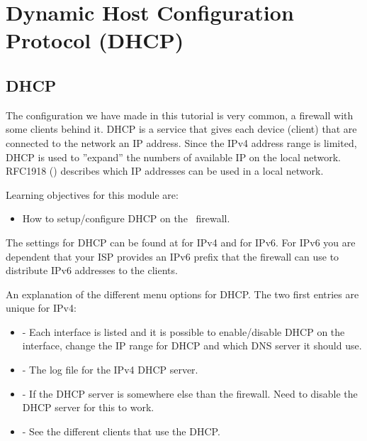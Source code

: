 \newpage

\section{Dynamic Host Configuration Protocol (DHCP)} \label{DHCP}


\subsection{DHCP}
The configuration we have made in this tutorial is very common, a firewall with some clients behind it. DHCP is a service that gives each device (client) that are connected to the network an IP address. Since the IPv4 address range is limited, DHCP is used to ''expand'' the numbers of available IP on the local network. RFC1918 (\cite{GeertJande1996}) describes which IP addresses can be used in a local network.

Learning objectives for this module are:
\begin{itemize}
    \item How to setup/configure DHCP on the \opnsense\ firewall.
\end{itemize}

The settings for DHCP can be found at  for IPv4 and  for IPv6. For IPv6 you are dependent that your ISP provides an IPv6 prefix that the firewall can use to distribute IPv6 addresses to the clients.

An explanation of the different menu options for DHCP. The two first entries are unique for IPv4:
\begin{itemize}
    \item {} - Each interface is listed and it is possible to enable/disable DHCP on the interface, change the IP range for DHCP and which DNS server it should use.
    \item {} - The log file for the IPv4 DHCP server.
    \item {} - If the DHCP server is somewhere else than the firewall. Need to disable the DHCP server for this to work.
    \item {} - See the different clients that use the DHCP.
\end{itemize}

